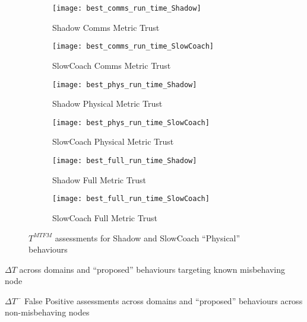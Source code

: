 \begin{figure}
	\begin{subfigure}[b]{0.5\textwidth}
		\centering
		\texttt{[image: best\_comms\_run\_time\_Shadow]}
		\caption{Shadow Comms Metric Trust}
		\label{fig:comms_time_shadow}
	\end{subfigure}
	\begin{subfigure}[b]{0.5\textwidth}
		\centering
		\texttt{[image: best\_comms\_run\_time\_SlowCoach]}
		\caption{SlowCoach Comms Metric Trust}
		\label{fig:comms_time_slowcoach}
	\end{subfigure}
	
	\begin{subfigure}[b]{0.5\textwidth}
		\centering
		\texttt{[image: best\_phys\_run\_time\_Shadow]}
		\caption{Shadow Physical Metric Trust }
		\label{fig:phys_time_shadow}
	\end{subfigure}
	\begin{subfigure}[b]{0.5\textwidth}
		\centering
		\texttt{[image: best\_phys\_run\_time\_SlowCoach]}
		\caption{SlowCoach Physical Metric Trust}
		\label{fig:phys_time_slowcoach}
	\end{subfigure}
		
	\begin{subfigure}[b]{0.5\textwidth}
		\centering
		\texttt{[image: best\_full\_run\_time\_Shadow]}
		\caption{Shadow Full Metric Trust }
		\label{fig:full_time_shadow}
	\end{subfigure}
	\begin{subfigure}[b]{0.5\textwidth}
		\centering
		\texttt{[image: best\_full\_run\_time\_SlowCoach]}
		\caption{SlowCoach Full Metric Trust}
		\label{fig:full_time_slowcoach}
	\end{subfigure}
	\caption{$T^{MTFM}$ assessments for Shadow and SlowCoach ``Physical'' behaviours}
	\label{fig:trust_shadow_slowcoach}
\end{figure}


	
\begin{table}
	\centering
	\caption{$\Delta T$ across domains and ``proposed'' behaviours targeting known misbehaving node}
	
	\label{tab:domain_deltas}
\end{table}

\begin{table}
	\centering
	\caption{$\Delta T^-$ False Positive assessments across domains and ``proposed'' behaviours across non-misbehaving nodes}
	
	\label{tab:domain_deltas_minus}
\end{table}

